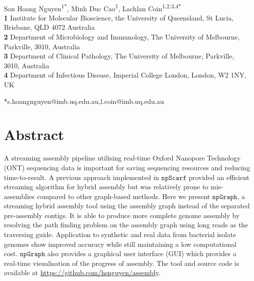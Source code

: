 \documentclass[10pt,letterpaper]{article}
\newcommand{\npscarf}{$\mathtt{npScarf}$}
\newcommand{\npgraph}{$\mathtt{npGraph}$}
\begin{document}
\vspace*{0.2in}

\begin{flushleft}
{\Large
\textbf{} %
}
\newline
\\
Son Hoang Nguyen\textsuperscript{1*},
Minh Duc Cao\textsuperscript{1},
Lachlan Coin\textsuperscript{1,2,3,4*}
\\
\bigskip
\textbf{1} Institute for Molecular Bioscience, the University of Queensland, 
St Lucia, Brisbane, QLD 4072 Australia
\\
\textbf{2} Department of Microbiology and Immunology, The University of Melbourne, Parkville, 3010, Australia
\\
\textbf{3} Department of Clinical Pathology, The University of Melbourne, Parkville, 3010, Australia
\\
\textbf{4} Department of Infectious Disease, Imperial College London, London, W2 1NY, UK
\bigskip

*s.hoangnguyen@imb.uq.edu.au,l.coin@imb.uq.edu.au

\end{flushleft}
\section*{Abstract}
A streaming assembly pipeline utilising real-time Oxford Nanopore Technology (ONT) sequencing data is important for saving sequencing resources and reducing time-to-result. A previous approach implemented in  \npscarf{} provided an efficient streaming algorithm for hybrid assembly but was relatively prone to mis-assemblies compared to other graph-based methods. 
Here we present \npgraph{}, a streaming hybrid assembly tool using the assembly graph instead of the separated pre-assembly contigs. It is able to produce more complete genome assembly by resolving the path finding problem on the assembly graph using long reads as the traversing guide. 
Application to synthetic and real data from bacterial isolate genomes show improved accuracy while still maintaining a low computational cost. 
\npgraph{} also provides a graphical user interface (GUI) which provides a real-time visualisation of the progress of assembly.
 The tool and source code is available at \url{https://github.com/hsnguyen/assembly}.
\end{document}
